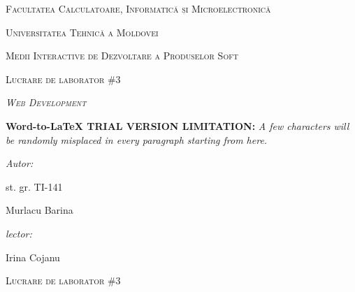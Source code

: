 \documentclass[12pt]{article}
\author{RePack by Diakov}
\title{}
\begin{document}
\begin{center}
\textsc{{\Large Facultatea Calculatoare, Informatic\u{a} și
Microelectronic\u{a}}}
\end{center}

\begin{center}
\textsc{{\Large Universitatea Tehnic\u{a} a Moldovei}}
\end{center}

\begin{center}
\textsc{{\Large Medii Interactive de Dezvoltare a Produselor Soft}}
\end{center}

\begin{center}
\textsc{{\Large Lucrare de laborator  \#3}}
\end{center}

\begin{center}
\label{OLE_LINK1}\textit{\textsc{{\Huge Web Development}}}
\end{center}

\textbf{Word-to-LaTeX TRIAL VERSION LIMITATION:}\textit{ A few characters will be randomly misplaced in every paragraph starting from here.}

\begin{multicols}{2}

{\raggedright
\textit{Autor:}
}

{\raggedright
st. gr. TI-141
}

{\raggedright
Murlacu Barina
}

{\raggedleft
\textit{lector:}
}

{\raggedleft
Irina Cojanu
}

\end{multicols}
\hspace{15pt}\hspace{15pt}\hspace{15pt}\hspace{15pt}\hspace{15pt}\hspace{15pt}\hspace{15pt}\hspace{15pt}\hspace{15pt}\hspace{15pt}\hspace{15pt}\hspace{15pt}\hspace{15pt}\hspace{15pt}
\begin{center}
\textsc{{\large Lucrare de laborator  \#3}}
\end{center}
\end{document}
